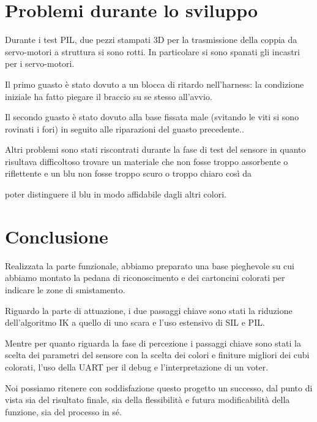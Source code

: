\documentclass[12pt]{report}
\begin{document}
\chapter{Problemi durante lo sviluppo}

Durante i test PIL, due pezzi stampati 3D per la trasmissione della coppia da servo-motori a struttura si sono rotti. In particolare si sono spanati gli incastri per i servo-motori.

Il primo guasto è stato dovuto a un blocca di ritardo nell'harness: la condizione iniziale ha fatto piegare il braccio su se stesso all'avvio.

Il secondo guasto è stato dovuto alla base fissata male (svitando le viti si sono rovinati i fori) in seguito alle riparazioni del guasto precedente..

Altri problemi sono stati riscontrati durante la fase di test del sensore in quanto risultava difficoltoso trovare un materiale che non fosse troppo assorbente o riflettente e un blu non fosse troppo scuro o troppo chiaro così da

poter distinguere il blu in modo affidabile dagli altri colori.

\chapter{Conclusione}

Realizzata la parte funzionale, abbiamo preparato una base pieghevole su cui abbiamo montato la pedana di riconoscimento e dei cartoncini colorati per indicare le zone di smistamento.

Riguardo la parte di attuazione, i due passaggi chiave sono stati la riduzione dell'algoritmo IK a quello di uno scara e l'uso estensivo di SIL e PIL.

Mentre per quanto riguarda la fase di percezione i passaggi chiave sono stati la scelta dei parametri del sensore con la scelta dei colori e finiture migliori dei cubi colorati, l'uso della UART per il debug e l'interpretazione di un voter.

Noi possiamo ritenere con soddisfazione questo progetto un successo, dal punto di vista sia del risultato finale, sia della flessibilità e futura modificabilità della funzione, sia del processo in sé.
\end{document}
